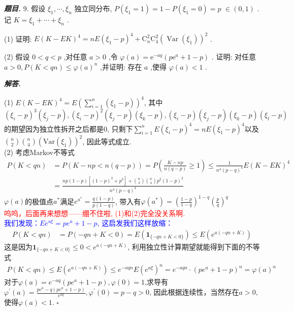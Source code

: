 \documentclass[10pt, a4paper, oneside]{ctexart}
\newenvironment{problem}{\begin{framed}\par\noindent\textbf{\textit{题目. }}}{\end{framed}\par}
\newenvironment{solution}{%
  \par\noindent\textbf{\textit{解答. }}\ignorespaces
}{%
  \hfill\ensuremath{\square}\par %
}
\begin{document}
\begin{problem}
    9. 假设 \( {\xi }_{1},\cdots ,{\xi }_{n} \) 独立同分布, \( P\left( {{\xi }_{1} = 1}\right)  = 1 - P\left( {{\xi }_{1} = 0}\right)  = {p} \) \(\in \left( {0,1}\right)  \) . 记 \( K = {\xi }_{1} + \cdots  + {\xi }_{n} \) .

(1) 证明: \( E{\left( K - EK\right) }^{4} = {nE}{\left( {\xi }_{1} - p\right) }^{4} + {\mathrm{C}}_{n}^{2}{\mathrm{C}}_{4}^{2}{\left( \operatorname{Var}\left( {\xi }_{1}\right) \right) }^{2} \) .

(2) 假设 \( 0 < q < p \) ,对任意 \( a > 0 \) ,令 \( \varphi \left( a\right)  = {\mathrm{e}}^{-{aq}}\left( {p{\mathrm{e}}^{a} + 1 - p}\right)  \) . 证明: 对任意 \( a > 0,P\left( {K < {qn}}\right)  \leq  \varphi {\left( a\right) }^{n} \) ,并证明: 存在 \( a \) ,使得 \( \varphi \left( a\right)  < 1 \) .
\end{problem}

\begin{solution}
    (1) $E(K-EK)^4=E(\sum_{i=1}^n(\xi_1-p))^4$, 其中$(\xi_i-p)^3(\xi_j-p),(\xi_i-p)^2(\xi_j-p)(\xi_k-p),(\xi_i-p)(\xi_j-p)(\xi_k-p)(\xi_l-p)$的期望因为独立性拆开之后都是$0$, 只剩下$\sum_{i=1}^nE(\xi_i-p)^4=nE(\xi_1-p)^4$以及${n \choose 2}{n \choose 4}(\text{Var}(\xi_1))^2$, 因此等式成立.\\
    (2) 考虑Markov不等式
    \begin{align*}
        P(K<qn)&=P(K-np<n(q-p))=P(\frac{K-np}{n(q-p)}\geq 1)\leq \frac{1}{n^4(p-q)^4}E(K-EK)^4\\
        &=\frac{np(1-p)[(1-p)^3+p^3]+{n \choose 2}{n \choose 4}p^2(1-p)^2}{n^4(p-q)^4}
    \end{align*}
    $\varphi(a)$的极值点$a^{*}$满足$e^{a^*}=\frac{q(1-p)}{p(1-q)}$, 带入有$\varphi(a^*)=(\frac{1-p}{1-q})^{1-q}(\frac{p}{q})^q$\\
    \textcolor{red}{呜呜，后面再来想想——绷不住啦, (1)和(2)完全没关系啊.}\\
    \textcolor{blue}{我们发现：$Ee^{a\xi}=pe^a+1-p$, 这启发我们这样放缩：}
    \begin{align*}
        P(K<qn)&=P(-qn+K<0)=E(\mathbf{1}_{\{-qn+K<0\}})\leq E(e^{a(-qn+K)})
    \end{align*}
    这是因为$\mathbf{1}_{\{-qn+K<0\}}\leq 0 <e^{a(-qn+K)}$, 利用独立性计算期望就能得到下面的不等式
    \begin{align*}
        P(K<qn)\leq E(e^{a(-qn+K)})\leq e^{-aqn}E(e^{a\xi})^n=e^{-aqn}\cdot (pe^a+1-p)^n=\varphi(a)^n
    \end{align*}
    对于$\varphi(a)=e^{-aq}(pe^a+1-p),\varphi(0)=1$,求导有$\varphi^{\prime}(a)=\frac{pe^a-q(pe^a+1-p)}{e^{aq}},\varphi^{\prime}(0)=p-q>0$, 因此根据连续性，当然存在$a>0$, 使得$\varphi(a)<1$.
\end{solution}
\end{document}
